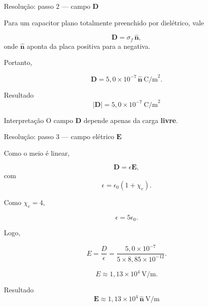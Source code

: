 \documentclass[aspectratio=169]{beamer}
\begin{document}
\begin{frame}{Resolução: passo 2 --- campo \(\mathbf D\)}

Para um capacitor plano totalmente preenchido por dielétrico, vale

\begin{equation}
\mathbf D = \sigma_f \,\hat{\mathbf n},
\end{equation}
onde \(\hat{\mathbf n}\) aponta da placa positiva para a negativa.

Portanto,

\begin{equation}
\mathbf D = 5,0\times 10^{-7}\,\hat{\mathbf n}\ \text{C/m}^2.
\end{equation}

\begin{alertblock}{Resultado}
\begin{equation}
|\mathbf D| = 5,0\times 10^{-7}\ \text{C/m}^2
\end{equation}
\end{alertblock}

\begin{block}{Interpretação}
O campo \(\mathbf D\) depende apenas da carga \textbf{livre}.
\end{block}

\end{frame}


\begin{frame}{Resolução: passo 3 --- campo elétrico \(\mathbf E\)}

Como o meio é linear,

\begin{equation}
\mathbf D = \epsilon \mathbf E,
\end{equation}
com
\begin{equation}
\epsilon = \epsilon_0(1+\chi_e).
\end{equation}

Como \(\chi_e=4\),

\begin{equation}
\epsilon = 5\epsilon_0.
\end{equation}

Logo,

\begin{equation}
E=\frac{D}{\epsilon}
=
\frac{5,0\times 10^{-7}}{5\times 8{,}85\times 10^{-12}}.
\end{equation}

\begin{equation}
E \approx 1{,}13\times 10^4\ \text{V/m}.
\end{equation}

\begin{alertblock}{Resultado}
\begin{equation}
\mathbf E \approx 1{,}13\times 10^4\,\hat{\mathbf n}\ \text{V/m}
\end{equation}
\end{alertblock}

\end{frame}
\end{document}
